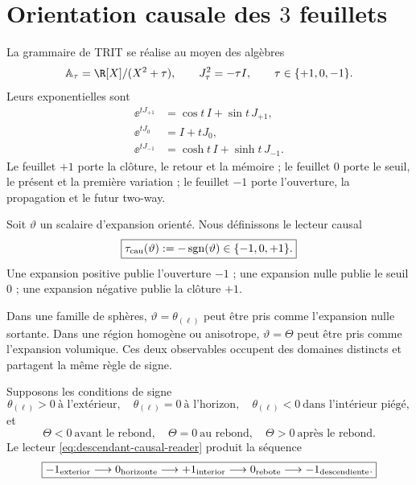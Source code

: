 \section{Orientation causale des \(3\) feuillets}

La grammaire de TRIT se réalise au moyen des algèbres
\begin{equation}
 \mathbb A_\tau=\R[X]/(X^2+\tau),
 \qquad
 J_\tau^2=-\tau I,
 \qquad
 \tau\in\{+1,0,-1\}.
 \label{eq:descendant-TRIT-algebras}
\end{equation}
Leurs exponentielles sont
\begin{align}
 \ee^{tJ_{+1}}&=\cos t\,I+\sin t\,J_{+1},
 \label{eq:descendant-elliptic}\\
 \ee^{tJ_0}&=I+tJ_0,
 \label{eq:descendant-parabolic}\\
 \ee^{tJ_{-1}}&=\cosh t\,I+\sinh t\,J_{-1}.
 \label{eq:descendant-hyperbolic}
\end{align}
Le feuillet \(+1\) porte la clôture, le retour et la mémoire ; le feuillet \(0\) porte le seuil,
le présent et la première variation ; le feuillet \(-1\) porte l'ouverture, la propagation et le
futur two-way.

Soit \(\vartheta\) un scalaire d'expansion orienté. Nous définissons le lecteur
causal
\begin{equation}
 \boxed{
 \tau_{\rm cau}(\vartheta):=-\operatorname{sgn}(\vartheta)
 \in\{-1,0,+1\}.}
 \label{eq:descendant-causal-reader}
\end{equation}
Une expansion positive publie l'ouverture \(-1\) ; une expansion nulle
publie le seuil \(0\) ; une expansion négative publie la clôture \(+1\).

Dans une famille de sphères, \(\vartheta=\theta_{(\ell)}\) peut être pris comme
l'expansion nulle sortante. Dans une région homogène ou anisotrope,
\(\vartheta=\Theta\) peut être pris comme l'expansion volumique. Ces
deux observables occupent des domaines distincts et partagent la même règle de
signe.

\begin{proposition}
\label{prop:descendant-double-threshold}
Supposons les conditions de signe
\begin{equation}
 \theta_{(\ell)}>0\ \text{à l'extérieur},
 \quad
 \theta_{(\ell)}=0\ \text{à l'horizon},
 \quad
 \theta_{(\ell)}<0\ \text{dans l'intérieur piégé},
 \label{eq:descendant-null-signs}
\end{equation}
et
\begin{equation}
 \Theta<0\ \text{avant le rebond},
 \quad
 \Theta=0\ \text{au rebond},
 \quad
 \Theta>0\ \text{après le rebond}.
 \label{eq:descendant-volume-signs}
\end{equation}
Le lecteur \cref{eq:descendant-causal-reader} produit la séquence
\begin{equation}
 \boxed{
 -1_{\rm exterior}
 \longrightarrow0_{\rm horizonte}
 \longrightarrow+1_{\rm interior}
 \longrightarrow0_{\rm rebote}
 \longrightarrow-1_{\rm descendiente}.}
 \label{eq:descendant-five-stage-sequence}
\end{equation}
\end{proposition}

